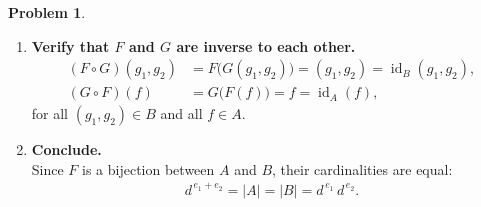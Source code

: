 \documentclass[12pt]{article}
\theoremstyle{definition} %
\newtheorem{problem}{Problem}
\theoremstyle{plain} %
\begin{document}
\begin{problem}
\begin{enumerate}
        \item\textbf{Verify that $F$ and $G$ are inverse to each other.}\\
              \begin{align}
                  (F\circ G)(g_1,g_2)
                  &=F\!\bigl(G(g_1,g_2)\bigr)
                    =(g_1,g_2)
                    =\operatorname{id}_B(g_1,g_2),\\
                  (G\circ F)(f)
                  &=G\!\bigl(F(f)\bigr)
                    =f
                    =\operatorname{id}_A(f),
              \end{align}
              for all $(g_1,g_2)\in B$ and all $f\in A$.

        \item\textbf{Conclude.}\\
              Since $F$ is a bijection between $A$ and $B$, their cardinalities are equal:
              \begin{align}
                  d^{\,e_1+e_2}=|A|=|B|=d^{\,e_1}\,d^{\,e_2}.
              \end{align}
              \qedhere
    \end{enumerate}
\end{problem}
\end{document}
